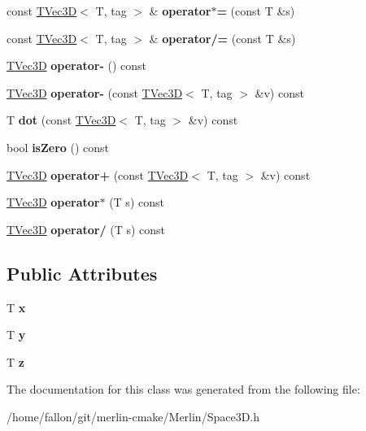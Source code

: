 \begin{DoxyCompactItemize}
const \hyperlink{classTVec3D}{T\+Vec3D}$<$ T, tag $>$ \& {\bfseries operator$\ast$=} (const T \&s)
\item 
\mbox{\label{classTVec3D_ae1b040880142245694c40958834a25b2}} 
const \hyperlink{classTVec3D}{T\+Vec3D}$<$ T, tag $>$ \& {\bfseries operator/=} (const T \&s)
\item 
\mbox{\label{classTVec3D_a574c5bd2f808c032d96c9ed2f8682af5}} 
\hyperlink{classTVec3D}{T\+Vec3D} {\bfseries operator-\/} () const
\item 
\mbox{\label{classTVec3D_a80d80d18a45fc6e56d034a76aa8d87d0}} 
\hyperlink{classTVec3D}{T\+Vec3D} {\bfseries operator-\/} (const \hyperlink{classTVec3D}{T\+Vec3D}$<$ T, tag $>$ \&v) const
\item 
\mbox{\label{classTVec3D_adee3326ef6d41778cedc0cf416b83e29}} 
T {\bfseries dot} (const \hyperlink{classTVec3D}{T\+Vec3D}$<$ T, tag $>$ \&v) const
\item 
\mbox{\label{classTVec3D_a6be61f329df7314311ed01ea1ef75bb0}} 
bool {\bfseries is\+Zero} () const
\item 
\mbox{\label{classTVec3D_a56abd301337a4faa2b0802451cdf3d0c}} 
\hyperlink{classTVec3D}{T\+Vec3D} {\bfseries operator+} (const \hyperlink{classTVec3D}{T\+Vec3D}$<$ T, tag $>$ \&v) const
\item 
\mbox{\label{classTVec3D_a567a8b5e0fb048a5696b7fccf2ada0fa}} 
\hyperlink{classTVec3D}{T\+Vec3D} {\bfseries operator$\ast$} (T s) const
\item 
\mbox{\label{classTVec3D_a53c9d1e6976f139873f4d14ac46e30c0}} 
\hyperlink{classTVec3D}{T\+Vec3D} {\bfseries operator/} (T s) const
\end{DoxyCompactItemize}
\subsection*{Public Attributes}
\begin{DoxyCompactItemize}
\item 
\mbox{\label{classTVec3D_a506fd1c28936d1c4e748cb40d7fdf179}} 
T {\bfseries x}
\item 
\mbox{\label{classTVec3D_aced349de73270c1a823f74b7459b6703}} 
T {\bfseries y}
\item 
\mbox{\label{classTVec3D_ae645f589a4bf957171170fa2c2ffd00f}} 
T {\bfseries z}
\end{DoxyCompactItemize}


The documentation for this class was generated from the following file\+:\begin{DoxyCompactItemize}
\item 
/home/fallon/git/merlin-\/cmake/\+Merlin/Space3\+D.\+h\end{DoxyCompactItemize}

